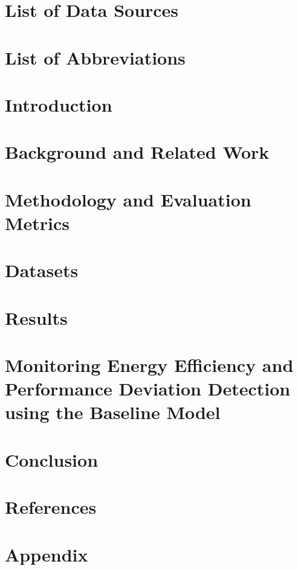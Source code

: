 \documentclass[12pt, letterpaper]{article}
\begin{document}



\pagebreak

\tableofcontents
\pagebreak
\listoffigures
\listoftables
\pagebreak

\section*{List of Data Sources}

\pagebreak

\section*{List of Abbreviations}

\pagebreak

\section{Introduction}

\pagebreak

\section{Background and Related Work}

\pagebreak

\section{Methodology and Evaluation Metrics}

\pagebreak

\section{Datasets}

\pagebreak

\section{Results}

\pagebreak

\section{Monitoring Energy Efficiency and Performance Deviation Detection using the Baseline Model}

\pagebreak

\section{Conclusion}

\pagebreak

\section{References}
\printbibliography[heading=none]
\pagebreak

\appendix
\section{Appendix}

\pagebreak


\end{document}
